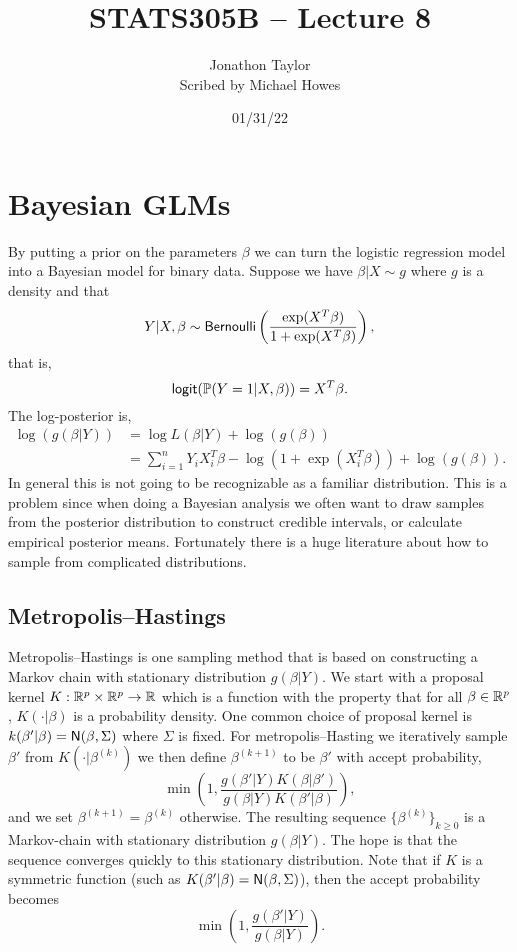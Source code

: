 




\title{STATS305B -- Lecture 8}
\author{Jonathon Taylor\\ Scribed by Michael Howes}
\date{01/31/22}

\pagestyle{fancy}
\fancyhf{}


\maketitle
\tableofcontents
\section{Bayesian GLMs}
By putting a prior on the parameters $\beta$ we can turn the logistic regression model into a Bayesian model for binary data. Suppose we have $\beta |X \sim g$ where $g$ is a density and that
\[Y|X,\beta \sim \mathsf{Bernoulli}\left(\frac{\exp(X^T\beta)}{1+\exp(X^T\beta)}\right), \]
that is,
\[\mathsf{logit}({\mathbb{P}}(Y=1|X,\beta)) = X^T\beta. \]
The log-posterior is,
\begin{align*}
    \log(g(\beta|Y)) &= \log L(\beta|Y)+\log(g(\beta))\\
    &=\sum_{i=1}^n Y_iX_i^T\beta - \log\left(1+\exp(X_i^T\beta)\right) + \log(g(\beta)).
\end{align*} 
In general this is not going to be recognizable as a familiar distribution. This is a problem since when doing a Bayesian analysis we often want to draw samples from the posterior distribution to construct credible intervals, or calculate empirical posterior means. Fortunately there is a huge literature about how to sample from complicated distributions.
\subsection{Metropolis--Hastings}
Metropolis--Hastings is  one sampling method that is based on constructing a Markov chain with stationary distribution $g(\beta|Y)$. We start with a proposal kernel $K:{\mathbb R}^p \times {\mathbb R}^p \to {\mathbb R}$ which is a function with the property that for all $\beta \in {\mathbb R}^p$, $K(\cdot|\beta)$ is a probability density. One common choice of proposal kernel is $k(\beta'|\beta) = \mathsf{N}(\beta,\Sigma)$ where $\Sigma$ is fixed. For metropolis--Hasting we iteratively sample $\beta'$ from  $K(\cdot|\beta^{(k)})$ we then define $\beta^{(k+1)}$  to be $\beta'$ with accept probability,
\[\min\left(1, \frac{g(\beta'|Y)K(\beta|\beta')}{g(\beta|Y)K(\beta'|\beta)}\right), \]
and we set $\beta^{(k+1)} =\beta^{(k)}$ otherwise. The resulting sequence $\{\beta^{(k)}\}_{k \ge 0}$ is a Markov-chain with stationary distribution $g(\beta|Y)$. The hope is that the sequence converges quickly to this stationary distribution. Note that if $K$  is a symmetric function (such as $K(\beta'|\beta)  =\mathsf{N}(\beta,\Sigma)$), then the accept probability becomes
\[\min\left(1, \frac{g(\beta'|Y)}{g(\beta|Y)}\right). \]
